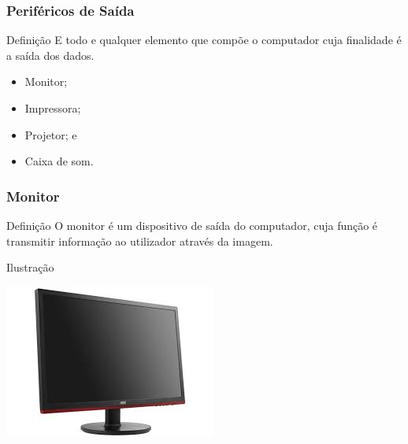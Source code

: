 \documentclass[aspectratio=169]{beamer} %
\begin{document}
\begin{frame}
	\frametitle{Periféricos de Saída}
	
	\begin{block}{Defini\c cão}
		E todo e qualquer elemento que compõe o computador cuja finalidade é a saída dos dados.
	\end{block}\vfill
	
	\begin{itemize}
		\item Monitor;
		\item Impressora; 
		\item Projetor; e
		\item Caixa de som.
	\end{itemize}
\end{frame}

\begin{frame}
	\frametitle{Monitor}
	
	\begin{block}{Defini\c cão}
		O monitor é um dispositivo de saída do computador, cuja função é transmitir informação ao utilizador através da imagem.
	\end{block}\vfill
	
	\begin{exampleblock}{Ilustra\c cão}
		\begin{center}
			\includegraphics[scale=0.4]{img/monitor}
		\end{center}		
	\end{exampleblock}
\end{frame}
\end{document}
